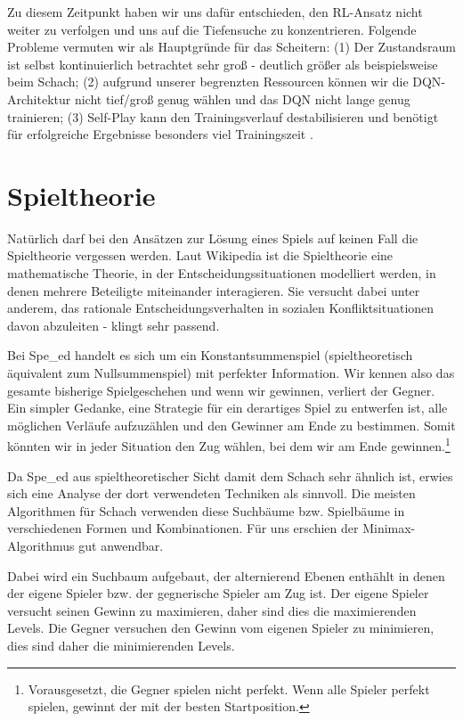 Zu diesem Zeitpunkt haben wir uns dafür entschieden, den \acrshort{RL}-Ansatz nicht weiter zu verfolgen und uns auf die Tiefensuche zu konzentrieren. Folgende Probleme vermuten wir als Hauptgründe für das Scheitern: (1) Der Zustandsraum ist selbst kontinuierlich betrachtet sehr groß - deutlich größer als beispielsweise beim Schach; (2) aufgrund unserer begrenzten Ressourcen können wir die \acrshort{DQN}-Architektur nicht tief/groß genug wählen und das \acrshort{DQN} nicht lange genug trainieren; (3) Self-Play kann den Trainingsverlauf destabilisieren und benötigt für erfolgreiche Ergebnisse besonders viel Trainingszeit \cite{Bai.22.06.2020}.


\section{Spieltheorie}
\label{cha:spieltheorie}

Nat\"urlich darf bei den Ans\"atzen zur L\"osung eines Spiels auf keinen Fall die Spieltheorie vergessen werden. Laut Wikipedia ist die Spieltheorie \glqq eine mathematische Theorie, in der Entscheidungssituationen modelliert werden, in denen mehrere Beteiligte miteinander interagieren. Sie versucht dabei unter anderem, das rationale Entscheidungsverhalten in sozialen Konfliktsituationen davon abzuleiten\grqq{} \cite{wikipedia_spieltheorie} - klingt sehr passend.

Bei Spe\_ed handelt es sich um ein Konstantsummenspiel (spieltheoretisch \"aquivalent zum Nullsummenspiel) mit perfekter Information. Wir kennen also das gesamte bisherige Spielgeschehen und wenn wir gewinnen, verliert der Gegner. Ein simpler Gedanke, eine Strategie f\"ur ein derartiges Spiel zu entwerfen ist, alle m\"oglichen Verl\"aufe aufzuz\"ahlen und den Gewinner am Ende zu bestimmen. Somit k\"onnten wir in jeder Situation den Zug w\"ahlen, bei dem wir am Ende gewinnen.\footnote{Vorausgesetzt, die Gegner spielen nicht perfekt. Wenn alle Spieler perfekt spielen, gewinnt der mit der besten Startposition.} 

Da Spe\_ed aus spieltheoretischer Sicht damit dem Schach sehr \"ahnlich ist, erwies sich eine Analyse der dort verwendeten Techniken als sinnvoll. Die meisten Algorithmen f\"ur Schach verwenden diese Suchb\"aume bzw. Spielb\"aume in verschiedenen Formen und Kombinationen. F\"ur uns erschien der Minimax-Algorithmus gut anwendbar.

Dabei wird ein Suchbaum aufgebaut, der alternierend Ebenen enth\"ahlt in denen der eigene Spieler bzw. der gegnerische Spieler am Zug ist. Der eigene Spieler versucht seinen Gewinn zu maximieren, daher sind dies die maximierenden Levels. Die Gegner versuchen den Gewinn vom eigenen Spieler zu minimieren, dies sind daher die minimierenden Levels. \cite{Shannon.1950, Campbell.1983}

